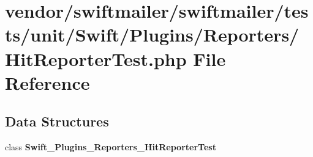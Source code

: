\section{vendor/swiftmailer/swiftmailer/tests/unit/\+Swift/\+Plugins/\+Reporters/\+Hit\+Reporter\+Test.php File Reference}
\label{_hit_reporter_test_8php}
\subsection*{Data Structures}
\begin{DoxyCompactItemize}
\item 
class {\bf Swift\+\_\+\+Plugins\+\_\+\+Reporters\+\_\+\+Hit\+Reporter\+Test}
\end{DoxyCompactItemize}
